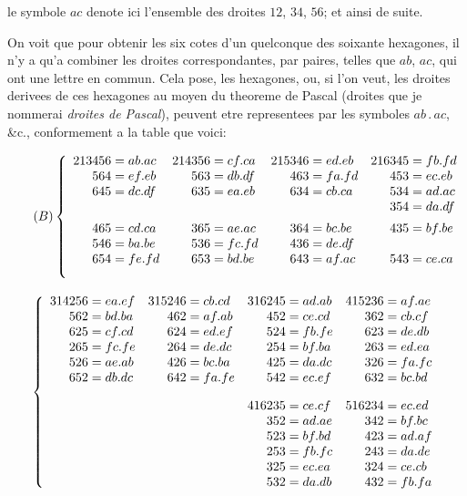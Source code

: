 \documentclass[12pt,a4paper]{article}
\begin{document}
le symbole $ac$ denote ici l'ensemble des droites $12$, $34$, $56$; et ainsi de suite.

On voit que pour obtenir les six cotes d'un quelconque des soixante hexagones, il n'y a qu'a combiner les droites correspondantes, par paires, telles que $ab$, $ac$, qui ont une lettre en commun. Cela pose, les hexagones, ou, si l'on veut, les droites derivees de ces hexagones au moyen du theoreme de Pascal (droites que je nommerai \textit{droites de Pascal}), peuvent etre representees par les symboles $ab\,.\,ac$, \&c., conformement a la table que voici:

\begin{equation}
\tag{$B$}
\left\{
\begin{array}{r@{\;=\;}l r@{\;=\;}l r@{\;=\;}l r@{\;=\;}l}
213456 & ab.ac & 214356 & cf.ca & 215346 & ed.eb & 216345 & fb.fd \\
564 & ef.eb & 563 & db.df & 463 & fa.fd & 453 & ec.eb \\
645 & dc.df & 635 & ea.eb & 634 & cb.ca & 534 & ad.ac \\
\multicolumn{6}{c}{} & 354 & da.df \\[0.5em]
465 & cd.ca & 365 & ae.ac & 364 & bc.be & 435 & bf.be \\
546 & ba.be & 536 & fc.fd & 436 & de.df & \multicolumn{2}{c}{} \\
654 & fe.fd & 653 & bd.be & 643 & af.ac & 543 & ce.ca \\[1em]
\end{array}
\right.
\end{equation}

\begin{equation}
\left\{
\begin{array}{r@{\;=\;}l r@{\;=\;}l r@{\;=\;}l r@{\;=\;}l}
314256 & ea.ef & 315246 & cb.cd & 316245 & ad.ab & 415236 & af.ae \\
562 & bd.ba & 462 & af.ab & 452 & ce.cd & 362 & cb.cf \\
625 & cf.cd & 624 & ed.ef & 524 & fb.fe & 623 & de.db \\
265 & fc.fe & 264 & de.dc & 254 & bf.ba & 263 & ed.ea \\
526 & ae.ab & 426 & bc.ba & 425 & da.dc & 326 & fa.fc \\
652 & db.dc & 642 & fa.fe & 542 & ec.ef & 632 & bc.bd \\[1em]
\multicolumn{4}{c}{} & 416235 & ce.cf & 516234 & ec.ed \\
\multicolumn{4}{c}{} & 352 & ad.ae & 342 & bf.bc \\
\multicolumn{4}{c}{} & 523 & bf.bd & 423 & ad.af \\
\multicolumn{4}{c}{} & 253 & fb.fc & 243 & da.de \\
\multicolumn{4}{c}{} & 325 & ec.ea & 324 & ce.cb \\
\multicolumn{4}{c}{} & 532 & da.db & 432 & fb.fa
\end{array}
\right.
\end{equation}
\end{document}
